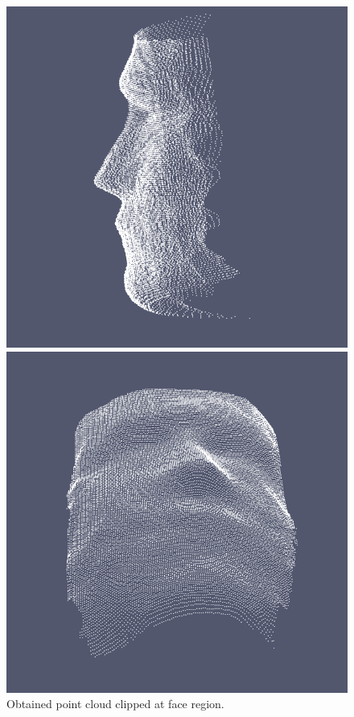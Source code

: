 \begin{figure}
  \centering
  \begin{minipage}{.5\textwidth}
    \centering
    \includegraphics[width=\textwidth]{Figures/Pictures/pts1.png}
  \end{minipage}%
  \begin{minipage}{.5\textwidth}
    \centering
    \includegraphics[width=\textwidth]{Figures/Pictures/pts.png}
  \end{minipage}
  \caption{Obtained point cloud clipped at face region.}
\end{figure}

